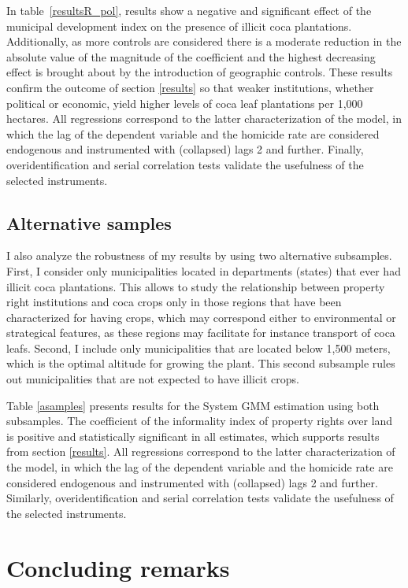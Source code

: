 \documentclass[a4paper, 12pt]{article}
\begin{document}
In table~\ref{resultsR_pol}, results show a negative and significant effect of the municipal development index on the presence of illicit coca plantations. Additionally, as more controls are considered there is a moderate reduction in the absolute value of the magnitude of the coefficient and the highest decreasing effect is brought about by the introduction of geographic controls. These results confirm the outcome of section \ref{results} so that weaker institutions, whether political or economic, yield higher levels of coca leaf plantations per 1,000 hectares. All regressions correspond to the latter characterization of the model, in which the lag of the dependent variable and the homicide rate are considered endogenous and instrumented with (collapsed) lags 2 and further. Finally, overidentification and serial correlation tests validate the usefulness of the selected instruments.

\subsection{Alternative samples}

I also analyze the robustness of my results by using two alternative subsamples. First, I consider only municipalities located in departments (states) that ever had illicit coca plantations. This allows to study the relationship between property right institutions and coca crops only in those regions that have been characterized for having crops, which may correspond either to environmental or strategical features, as these regions may facilitate for instance transport of coca leafs. Second, I include only municipalities that are located below 1,500 meters, which is the optimal altitude for growing the plant. This second subsample rules out municipalities that are not expected to have illicit crops.

Table \ref{asamples} presents results for the System GMM estimation using both subsamples. The coefficient of the informality index of property rights over land is positive and statistically significant in all estimates, which supports results from section \ref{results}. All regressions correspond to the latter characterization of the model, in which the lag of the dependent variable and the homicide rate are considered endogenous and instrumented with (collapsed) lags 2 and further. Similarly, overidentification and serial correlation tests validate the usefulness of the selected instruments.

\section{Concluding remarks}
\end{document}
